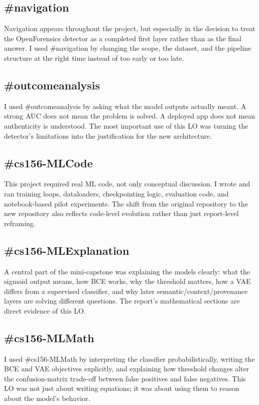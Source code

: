 \documentclass[11pt]{article}
\begin{document}
\subsection*{\#navigation}
Navigation appears throughout the project, but especially in the decision to treat the OpenForensics detector as a completed first layer rather than as the final answer. I used \#navigation by changing the scope, the dataset, and the pipeline structure at the right time instead of too early or too late.

\subsection*{\#outcomeanalysis}
I used \#outcomeanalysis by asking what the model outputs actually meant. A strong AUC does not mean the problem is solved. A deployed app does not mean authenticity is understood. The most important use of this LO was turning the detector's limitations into the justification for the new architecture.

\subsection*{\#cs156-MLCode}
This project required real ML code, not only conceptual discussion. I wrote and ran training loops, dataloaders, checkpointing logic, evaluation code, and notebook-based pilot experiments. The shift from the original repository to the new repository also reflects code-level evolution rather than just report-level reframing.

\subsection*{\#cs156-MLExplanation}
A central part of the mini-capstone was explaining the models clearly: what the sigmoid output means, how BCE works, why the threshold matters, how a VAE differs from a supervised classifier, and why later semantic/context/provenance layers are solving different questions. The report's mathematical sections are direct evidence of this LO.

\subsection*{\#cs156-MLMath}
I used \#cs156-MLMath by interpreting the classifier probabilistically, writing the BCE and VAE objectives explicitly, and explaining how threshold changes alter the confusion-matrix trade-off between false positives and false negatives. This LO was not just about writing equations; it was about using them to reason about the model's behavior.
\end{document}
